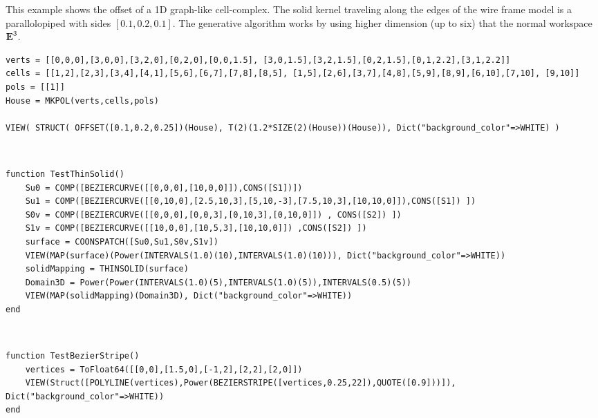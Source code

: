 \begin{coding}[Algebraic computation of FE = $\delta_1$]
\begin{condition}
This example shows the offset of a 1D graph-like cell-complex. The solid kernel traveling along the edges of the wire frame model is a parallolopiped with sides $[0.1,0.2,0.1]$.
The generative algorithm works by using higher dimension (up to six) that the normal workspace $\mathbb{I\!\!E}^3$.

\begin{lstlisting}[language=JuliaLocal, style=julia, mathescape=true]
verts = [[0,0,0],[3,0,0],[3,2,0],[0,2,0],[0,0,1.5], [3,0,1.5],[3,2,1.5],[0,2,1.5],[0,1,2.2],[3,1,2.2]]
cells = [[1,2],[2,3],[3,4],[4,1],[5,6],[6,7],[7,8],[8,5], [1,5],[2,6],[3,7],[4,8],[5,9],[8,9],[6,10],[7,10], [9,10]]
pols = [[1]]
House = MKPOL(verts,cells,pols)

VIEW( STRUCT( OFFSET([0.1,0.2,0.25])(House), T(2)(1.2*SIZE(2)(House))(House)), Dict("background_color"=>WHITE) )
\end{lstlisting}
\end{condition}


\begin{condition}[aaaaaaa]\
\begin{lstlisting}[language=JuliaLocal, style=julia, mathescape=true]
function TestThinSolid()
	Su0 = COMP([BEZIERCURVE([[0,0,0],[10,0,0]]),CONS([S1])])
	Su1 = COMP([BEZIERCURVE([[0,10,0],[2.5,10,3],[5,10,-3],[7.5,10,3],[10,10,0]]),CONS([S1]) ])
	S0v = COMP([BEZIERCURVE([[0,0,0],[0,0,3],[0,10,3],[0,10,0]]) , CONS([S2]) ]) 
	S1v = COMP([BEZIERCURVE([[10,0,0],[10,5,3],[10,10,0]]) ,CONS([S2]) ])
	surface = COONSPATCH([Su0,Su1,S0v,S1v])
	VIEW(MAP(surface)(Power(INTERVALS(1.0)(10),INTERVALS(1.0)(10))), Dict("background_color"=>WHITE))
	solidMapping = THINSOLID(surface)
	Domain3D = Power(Power(INTERVALS(1.0)(5),INTERVALS(1.0)(5)),INTERVALS(0.5)(5))
	VIEW(MAP(solidMapping)(Domain3D), Dict("background_color"=>WHITE))
end
\end{lstlisting}
\end{condition}

\begin{condition}[aaaaaaa]\
\begin{lstlisting}[language=JuliaLocal, style=julia, mathescape=true]
function TestBezierStripe()
	vertices = ToFloat64([[0,0],[1.5,0],[-1,2],[2,2],[2,0]])
	VIEW(Struct([POLYLINE(vertices),Power(BEZIERSTRIPE([vertices,0.25,22]),QUOTE([0.9]))]), Dict("background_color"=>WHITE))
end
\end{lstlisting}
\end{condition}


\end{coding}
